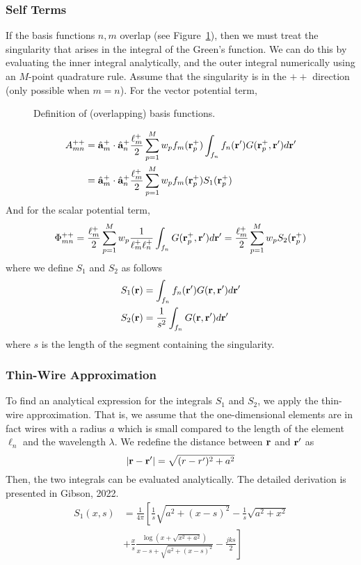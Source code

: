 \subsubsection{Self Terms}
If the basis functions $n, m$ overlap (see Figure~\ref{fig:mom_basis3}), then we must treat the singularity that arises in the integral of the Green's function. We can do this by evaluating the inner integral analytically, and the outer integral numerically using an $M$-point quadrature rule. Assume that the singularity is in the $++$ direction (only possible when $m = n$). For the vector potential term,
\begin{figure}[b]
	\centering
	
	\caption{Definition of (overlapping) basis functions.}
	\label{fig:mom_basis3}
\end{figure}
\begin{align*}
	A_{mn}^{++} & = \hat{\mathbf{a}}_m^{+} \cdot \hat{\mathbf{a}}_n^{+} \frac{\ell_m^+}{2} \sum_{p = 1}^M w_p f_m(\mathbf{r}_p^+) \int_{f_n} f_n(\mathbf{r}^\prime) G(\mathbf{r}_p^+, \mathbf{r}^\prime) d\mathbf{r}^\prime \\
	& = \hat{\mathbf{a}}_m^{+} \cdot \hat{\mathbf{a}}_n^{+} \frac{\ell_m^+}{2} \sum_{p = 1}^M w_p f_m(\mathbf{r}_p^+) S_1(\mathbf{r}_p^+)
\end{align*}
And for the scalar potential term,
\begin{equation*}
	\Phi_{mn}^{++} = \frac{\ell_m^+}{2} \sum_{p = 1}^M w_p \frac{1}{\ell_m^+ \ell_n^+} \int_{f_n} G(\mathbf{r}_p^+, \mathbf{r}^\prime) d\mathbf{r}^\prime = \frac{\ell_m^+}{2} \sum_{p = 1}^M w_p S_2(\mathbf{r}_p^+)
\end{equation*}
where we define $S_1$ and $S_2$ as follows
\begin{align}
	S_1(\mathbf{r}) & = \int_{f_n} f_n(\mathbf{r}^\prime) G(\mathbf{r}, \mathbf{r}^\prime) d\mathbf{r}^\prime \\
	S_2(\mathbf{r}) & = \frac{1}{s^2} \int_{f_n} G(\mathbf{r}, \mathbf{r}^\prime) d\mathbf{r}^\prime
\end{align}
where $s$ is the length of the segment containing the singularity. 

\subsubsection{Thin-Wire Approximation}
To find an analytical expression for the integrals $S_1$ and $S_2$, we apply the thin-wire approximation. That is, we assume that the one-dimensional elements are in fact wires with a radius $a$ which is small compared to the length of the element $\ell_n$ and the wavelength $\lambda$. We redefine the distance between $\mathbf{r}$ and $\mathbf{r}^\prime$ as
\begin{equation*}
	|\mathbf{r} - \mathbf{r}^\prime| = \sqrt{(r - r^\prime)^2 + a^2}
\end{equation*}
Then, the two integrals can be evaluated analytically. The detailed derivation is presented in Gibson, 2022.
\begin{equation}
	\begin{aligned}
		S_1(x, s) & = \frac{1}{4\pi} \left[ \frac{1}{s} \sqrt{a^2 + (x - s)^2} - \frac{1}{s} \sqrt{a^2 + x^2} \right. \\
		 & + \left. \frac{x}{s} \frac{\log\left( x + \sqrt{x^2 + a^2} \right)}{x - s + \sqrt{a^2 + (x - s)^2}} - \frac{j k s}{2} \right]
	\end{aligned}
\end{equation}

